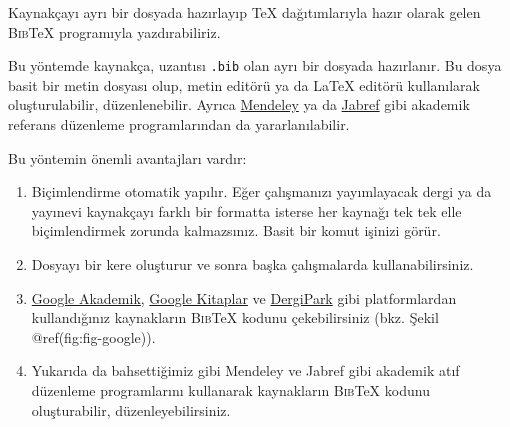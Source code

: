 \documentclass[
  letterpaper,
  DIV=11,
  numbers=noendperiod]{scrreprt}
\providecommand{\tightlist}{%
  \setlength{\itemsep}{0pt}\setlength{\parskip}{0pt}}\usepackage{longtable,booktabs,array}
\begin{document}
Kaynakçayı ayrı bir dosyada hazırlayıp {\TeX} dağıtımlarıyla hazır
olarak gelen \textsc{Bib}{\TeX} programıyla yazdırabiliriz.

Bu yöntemde kaynakça, uzantısı \texttt{.bib} olan ayrı bir dosyada
hazırlanır. Bu dosya basit bir metin dosyası olup, metin editörü ya da
{\LaTeX} editörü kullanılarak oluşturulabilir, düzenlenebilir. Ayrıca
\href{https://www.mendeley.com/?interaction_required=true}{Mendeley} ya
da \href{https://www.jabref.org/}{Jabref} gibi akademik referans
düzenleme programlarından da yararlanılabilir.

Bu yöntemin önemli avantajları vardır:

\begin{enumerate}
\def\labelenumi{\arabic{enumi}.}
\tightlist
\item
  Biçimlendirme otomatik yapılır. Eğer çalışmanızı yayımlayacak dergi ya
  da yayınevi kaynakçayı farklı bir formatta isterse her kaynağı tek tek
  elle biçimlendirmek zorunda kalmazsınız. Basit bir komut işinizi
  görür.
\item
  Dosyayı bir kere oluşturur ve sonra başka çalışmalarda
  kullanabilirsiniz.
\item
  \href{https://scholar.google.com.tr/}{Google Akademik},
  \href{https://books.google.com.tr/}{Google Kitaplar} ve
  \href{http://www.dergipark.org.tr/tr/}{DergiPark} gibi platformlardan
  kullandığınız kaynakların \textsc{Bib}{\TeX} kodunu çekebilirsiniz
  (bkz. Şekil @ref(fig:fig-google)).
\item
  Yukarıda da bahsettiğimiz gibi Mendeley ve Jabref gibi akademik atıf
  düzenleme programlarını kullanarak kaynakların \textsc{Bib}{\TeX}
  kodunu oluşturabilir, düzenleyebilirsiniz.
\end{enumerate}
\end{document}
